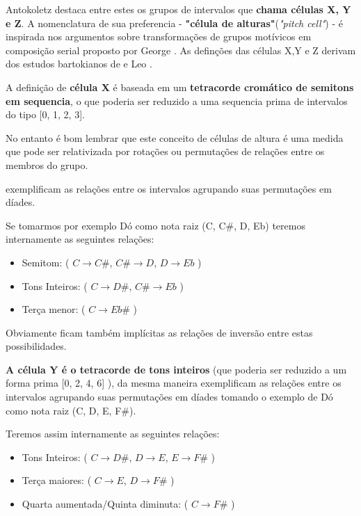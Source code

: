 \documentclass[
	12pt,				%
	openright,			%
	twoside,			%
	a4paper,			%
	english,			%
	french,				%
	spanish,			%
	brazil				%
	]{abntex2}
\begin{document}
Antokoletz destaca entre estes os grupos de intervalos que \textbf{chama células X, Y e Z}\cite[ p.69-77]{antokoletz1984music}. A nomenclatura de sua preferencia - \textbf{"célula de alturas"}(\textit{"pitch cell"}) - é inspirada nos argumentos sobre transformações de grupos motívicos em composição serial proposto por George . As definções das células X,Y e Z derivam dos estudos bartokianos de  e Leo .

A definição de \textbf{célula X } é baseada em um \textbf{tetracorde cromático de semitons em sequencia}, o que poderia ser reduzido a uma sequencia prima de intervalos do tipo [0, 1, 2, 3]. 

No entanto é bom lembrar que este conceito de células de altura é uma medida que pode ser relativizada por rotações ou permutações de relações entre os membros do grupo.

 exemplificam as relações entre os intervalos agrupando suas permutações em díades.

Se tomarmos por exemplo Dó como nota raiz (C, C\#, D, Eb) teremos internamente as seguintes relações:


\begin{itemize}
\item Semitom: ( $C \rightarrow C\#$, $C\# \rightarrow D$, $D \rightarrow Eb$ ) 

\item Tons Inteiros: ( $C \rightarrow D\#$, $C\# \rightarrow Eb$ )

\item Terça menor: ( $C \rightarrow Eb\#$ )
\end{itemize}

Obviamente ficam também implícitas as relações de inversão entre estas possibilidades.

\textbf{A célula Y é o tetracorde de tons inteiros} (que poderia ser reduzido a um forma prima [0, 2, 4, 6] ), da mesma maneira  exemplificam as relações entre os intervalos agrupando suas permutações em díades tomando o exemplo de Dó como nota raiz (C, D, E, F\#). 

Teremos assim internamente as seguintes relações:

\begin{itemize}
\item Tons Inteiros: ( $C \rightarrow D\#$, $D \rightarrow E$, $E \rightarrow F\#$ ) 

\item Terça maiores: ( $C \rightarrow E$, $D \rightarrow F\#$ )

\item Quarta aumentada/Quinta diminuta: ( $C \rightarrow F\#$ )
\end{itemize}
\end{document}
